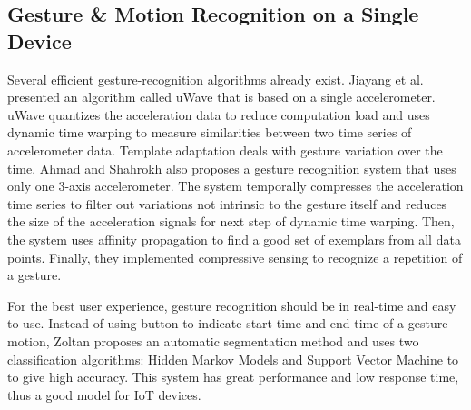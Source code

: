 
\subsection{Gesture \& Motion Recognition on a Single Device}

Several efficient gesture-recognition algorithms already exist. Jiayang et al. \cite{Liu:2009, LiuuWave} presented an algorithm called uWave that is based on a single accelerometer. uWave quantizes the acceleration data to reduce computation load and uses dynamic time warping to measure similarities between two time series of accelerometer data. Template adaptation deals with gesture variation over the time. Ahmad and Shahrokh \cite{Ahmad:2010} also proposes a gesture recognition system that uses only one 3-axis accelerometer. The system temporally compresses the acceleration time series to filter out variations not intrinsic to the gesture itself and reduces the size of the acceleration signals for next step of dynamic time warping. Then, the system uses affinity propagation to find a good set of exemplars from all data points. Finally, they implemented compressive sensing to recognize a repetition of a gesture. 

For the best user experience, gesture recognition should be in real-time and easy to use. Instead of using button to indicate start time and end time of a gesture motion, Zoltan \cite{Zoltan} proposes an automatic segmentation method and uses two classification algorithms: Hidden Markov Models and Support Vector Machine to to give high accuracy. This system has great performance and low response time, thus a good model for \gls{IoT} devices.
